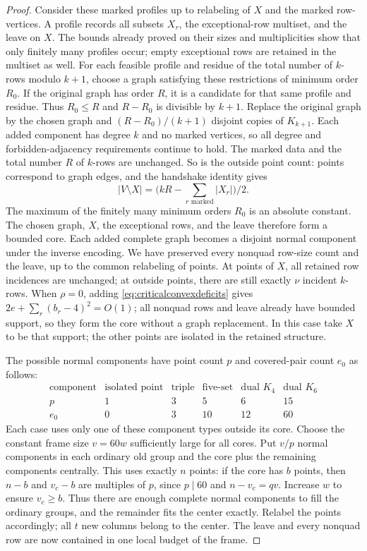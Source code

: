 \documentclass[11pt]{article}
\begin{document}
\begin{proof}
Consider these marked profiles up to relabeling of $X$ and the marked
row-vertices. A profile records all subsets $X_r$, the exceptional-row
multiset, and the leave on $X$. The bounds already proved on their sizes
and multiplicities show that only finitely many profiles occur; empty
exceptional rows are retained in the multiset as well.
For each feasible profile and residue of the total number of $k$-rows
modulo $k+1$, choose a graph satisfying these restrictions of minimum
order $R_0$. If the original graph has order $R$, it is a candidate for
that same profile and residue. Thus $R_0\le R$ and $R-R_0$ is divisible
by $k+1$. Replace the original graph
by the chosen graph and $(R-R_0)/(k+1)$ disjoint copies of $K_{k+1}$.
Each added component has degree $k$ and no marked vertices, so all degree
and forbidden-adjacency requirements continue to hold. The marked data
and the total number $R$ of $k$-rows are unchanged. So is the outside
point count: points correspond to graph edges, and the handshake identity
gives
\[
 |V\setminus X|=\bigl(kR-\sum_{r\text{ marked}}|X_r|\bigr)/2.
\]
The maximum of the finitely many minimum orders $R_0$ is an absolute
constant. The chosen graph, $X$, the exceptional rows, and the leave
therefore form a bounded core. Each added complete graph becomes a
disjoint normal component under the inverse encoding. We have preserved
every nonquad row-size count and the leave, up to the common relabeling
of points. At points of $X$, all retained row incidences are unchanged;
at outside points, there are still exactly $\nu$ incident $k$-rows.
When $\rho=0$, adding \eqref{eq:criticalconvexdeficits} gives
$2e+\sum_r(b_r-4)^2=O(1)$; all nonquad rows and leave already have
bounded support, so they form the core without a graph replacement.
In this case take $X$ to be that support; the other points are isolated
in the retained structure.

The possible normal components have point count $p$ and covered-pair
count $e_0$ as follows:
\[
\begin{array}{c|ccccc}
 \text{component}&\text{isolated point}&\text{triple}&\text{five-set}
                    &\text{dual }K_4&\text{dual }K_6\\ \hline
 p&1&3&5&6&15\\
 e_0&0&3&10&12&60
\end{array}
\]
Each case uses only one of these component types outside its core.
Choose the constant frame size $v=60w$ sufficiently large for all cores.
Put $v/p$ normal components in each ordinary old group and the core
plus the remaining components centrally. This uses exactly $n$ points:
if the core has $b$ points, then $n-b$ and $v_c-b$ are multiples of $p$,
since $p\mid60$ and $n-v_c=qv$. Increase $w$ to ensure $v_c\ge b$.
Thus there are enough complete normal components to fill the ordinary
groups, and the remainder fits the center exactly. Relabel the points
accordingly; all $t$ new columns belong to the center. The leave and every
nonquad row are now contained in one local budget of the frame.


\end{proof}
\end{document}
